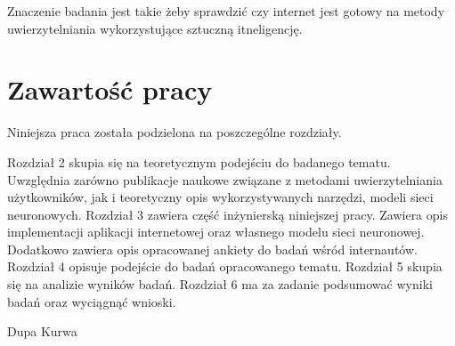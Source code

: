 Znaczenie badania jest takie żeby sprawdzić czy internet jest gotowy na metody uwierzytelniania wykorzystujące sztuczną itneligencję.

\section{Zawartość pracy}
Niniejsza praca została podzielona na poszczególne rozdziały.

Rozdział 2 skupia się na teoretycznym podejściu do badanego tematu. Uwzględnia zarówno publikacje naukowe związane z metodami uwierzytelniania użytkowników, jak i teoretyczny opis wykorzystywanych narzędzi, modeli sieci neuronowych.
Rozdział 3 zawiera część inżynierską niniejszej pracy. Zawiera opis implementacji aplikacji internetowej oraz własnego modelu sieci neuronowej. Dodatkowo zawiera opis opracowanej ankiety do badań wśród internautów.
Rozdział 4 opisuje podejście do badań opracowanego tematu.
Rozdział 5 skupia się na analizie wyników badań.
Rozdział 6 ma za zadanie podsumować wyniki badań oraz wyciągnąć wnioski.


Dupa Kurwa




